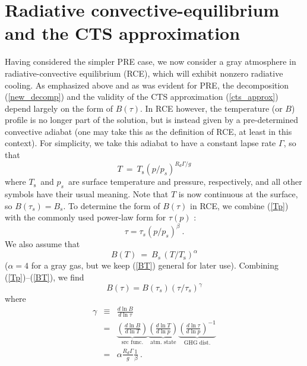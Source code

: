 \documentclass{ametsoc}
\newcommand{\beqn}{\begin{equation}}
\newcommand{\eeqn}{\end{equation}}
\newcommand{\beqa}{\begin{eqnarray}}
\newcommand{\eeqa}{\end{eqnarray}}
\newcommand{\eqnref}[1]{(\ref{#1})}
\newcommand{\der}[2]{\ensuremath{\frac{d #1}{d #2}}}
\newcommand{\Rd}{\ensuremath{R_d}}
\newcommand{\Ts}{\ensuremath{T_\mathrm{s}}}
\newcommand{\ps}{\ensuremath{p_s}}
\newcommand{\taus}{\ensuremath{\tau_s}}
\newcommand{\Bs}{\ensuremath{B_s}}
\begin{document}
\section{Radiative convective-equilibrium and the CTS approximation} \label{sec_rce}
Having considered the simpler PRE case, we now consider a gray atmosphere in radiative-convective equilibrium (RCE), which will exhibit nonzero radiative cooling. As emphasized above and as was evident for PRE, the decomposition \eqnref{new_decomp} and the validity of the CTS approximation \eqnref{cts_approx} depend largely on the form of $B(\tau)$. In RCE however,  the temperature (or $B$) profile is no longer part of the solution, but is instead given by a pre-determined convective adiabat (one may take this as the definition of RCE, at least in this context). For simplicity, we take this adiabat to have a constant lapse rate $\Gamma$, so that  
\beqn
	T \ = \ \Ts(p/\ps)^{\Rd\Gamma/g} 
	\label{Tp}
\eeqn
where \Ts\ and \ps\ are surface temperature and pressure, respectively, and all other symbols have their usual meaning. Note that $T$ is now continuous at the surface, so $B(\taus)=B_s$. To determine the form of  $B(\tau)$ in RCE, we combine \eqnref{Tp} with the commonly used power-law form for $\tau(p)$ \citep[e.g.][]{cronin2015b,robinson2012,frierson2006}:
 \beqn
 	\tau = \taus(p/\ps)^\beta  \ .
	\label{taup}
\eeqn 
We also assume that  
\beqn
	B(T)\ = \ \Bs\, (T/\Ts)^\alpha
	\label{BT}
\eeqn
($\alpha=4$ for a gray gas, but we keep \eqnref{BT} general for later use). Combining \eqnref{Tp}--\eqnref{BT}, we find
\beqn
	B(\tau) = B(\taus)(\tau/\taus)^\gamma
	\label{Btau1}
\eeqn
 where
 \begin{subequations}
	  \beqa
 		\gamma & \equiv & \der{\ln B}{\ln \tau} \label{gamma_def} \\[5pt]
					 &    = 	   & \underbrace{\left(\der{\ln B}{\ln T}\right)}_{\text{src func.}} \underbrace{\left(\der{\ln T}{\ln p}\right)}_{\text{atm. state}}\underbrace{\left(\der{\ln\tau}{\ln p}\right)^{-1}}_{\text{GHG dist.}} 
					 						\label{gamma_facs} \\[5pt]
				 	&    = 	   &  \alpha  \frac{R_d\Gamma}{g} \frac{1}{\beta} \ . \label{gamma_rce}
	\eeqa
	\label{gamma_eqns}
\end{subequations}
\end{document}
